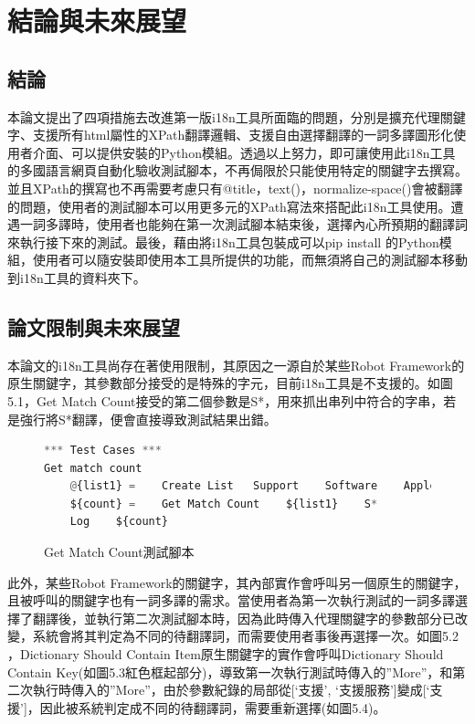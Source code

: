 \chapter{結論與未來展望}

\section{結論}
本論文提出了四項措施去改進第一版i18n工具所面臨的問題，分別是擴充代理關鍵字、支援所有html屬性的XPath翻譯邏輯、支援自由選擇翻譯的一詞多譯圖形化使用者介面、可以提供安裝的Python模組。透過以上努力，即可讓使用此i18n工具的多國語言網頁自動化驗收測試腳本，不再侷限於只能使用特定的關鍵字去撰寫。並且XPath的撰寫也不再需要考慮只有@title，text()，normalize-space()會被翻譯的問題，使用者的測試腳本可以用更多元的XPath寫法來搭配此i18n工具使用。遭遇一詞多譯時，使用者也能夠在第一次測試腳本結束後，選擇內心所預期的翻譯詞來執行接下來的測試。最後，藉由將i18n工具包裝成可以pip install 的Python模組，使用者可以隨安裝即使用本工具所提供的功能，而無須將自己的測試腳本移動到i18n工具的資料夾下。

\section{論文限制與未來展望}
本論文的i18n工具尚存在著使用限制，其原因之一源自於某些Robot Framework的原生關鍵字，其參數部分接受的是特殊的字元，目前i18n工具是不支援的。如圖5.1，Get Match Count接受的第二個參數是S*，用來抓出串列中符合的字串，若是強行將S*翻譯，便會直接導致測試結果出錯。

\begin{figure}[H]
\centering
\begin{lstlisting}[language={python}]
*** Test Cases ***
Get match count
    @{list1} =    Create List   Support    Software    Apple
    ${count} =    Get Match Count    ${list1}    S*
    Log    ${count} 
\end{lstlisting}
\caption{Get Match Count測試腳本}
\end{figure}

此外，某些Robot Framework的關鍵字，其內部實作會呼叫另一個原生的關鍵字，且被呼叫的關鍵字也有一詞多譯的需求。當使用者為第一次執行測試的一詞多譯選擇了翻譯後，並執行第二次測試腳本時，因為此時傳入代理關鍵字的參數部分已改變，系統會將其判定為不同的待翻譯詞，而需要使用者事後再選擇一次。如圖5.2 ，Dictionary Should Contain Item原生關鍵字的實作會呼叫Dictionary Should Contain Key(如圖5.3紅色框起部分)，導致第一次執行測試時傳入的”More”，和第二次執行時傳入的”More”，由於參數紀錄的局部從[‘支援’, ‘支援服務’]變成[‘支援’]，因此被系統判定成不同的待翻譯詞，需要重新選擇(如圖5.4)。\\

